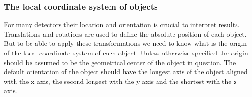 \subsubsection{The local coordinate system of objects}
\label{OriginOfObjects}

For many detectors their location and orientation is crucial to interpret results.  Translations and rotations are used to define the absolute position of each object. But to be able to apply these transformations we need to know what is the origin of the local coordinate system of each object. Unless otherwise specified the origin should be assumed to be the geometrical center of the object in question. The default orientation of the object should have the longest axis of the object aligned with the x axis, the second longest with the y axis and the shortest with the z axis.

